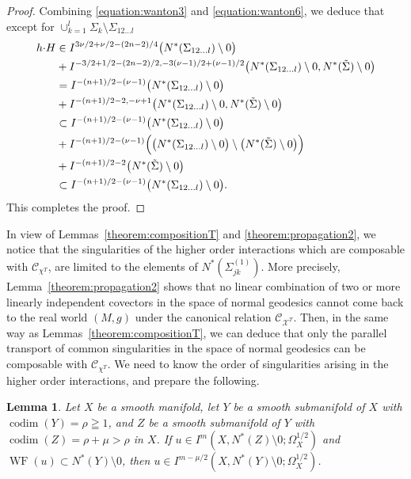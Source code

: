 \documentclass[a4paper,11pt,reqno]{amsart}
\numberwithin{equation}{section}
\newtheorem{lemma}[theorem]{Lemma}
\theoremstyle{definition}
\theoremstyle{remark}
\begin{document}
\begin{proof}
%
%
Combining \eqref{equation:wanton3} and \eqref{equation:wanton6}, 
we deduce that except for  $\cup_{k=1}^l\Sigma_k\setminus\Sigma_{12\dotsc{l}}$ 
%
%
\begin{align*}
   h{\cdot}H 
& \in 
    I^{3\nu/2+\nu/2-(2n-2)/4}\bigl(N^\ast(\Sigma_{12\dotsc{l}})\setminus0\bigr)
\\
& +
   I^{-3/2+1/2-(2n-2)/2,-3(\nu-1)/2+(\nu-1)/2}\bigl(N^\ast(\Sigma_{12\dotsc{l}})\setminus0,N^\ast(\tilde{\Sigma})\setminus0\bigr)
\\
& =
    I^{-(n+1)/2-(\nu-1)}\bigl(N^\ast(\Sigma_{12\dotsc{l}})\setminus0\bigr)
\\
& +
   I^{-(n+1)/2-2,-\nu+1}\bigl(N^\ast(\Sigma_{12\dotsc{l}})\setminus0,N^\ast(\tilde{\Sigma})\setminus0\bigr)
\\
& \subset 
   I^{-(n+1)/2-(\nu-1)}\bigl(N^\ast(\Sigma_{12\dotsc{l}})\setminus0\bigr)
\\
& +
   I^{-(n+1)/2-(\nu-1)}\Bigl(\bigl(N^\ast(\Sigma_{12\dotsc{l}})\setminus0\bigr) \setminus \bigl(N^\ast(\tilde{\Sigma})\setminus0\bigr)\Bigr) 
\\
& +
   I^{-(n+1)/2-2}\bigl(N^\ast(\tilde{\Sigma})\setminus0\bigr)
\\
& \subset
    I^{-(n+1)/2-(\nu-1)}\bigl(N^\ast(\Sigma_{12\dotsc{l}})\setminus0\bigr).
\end{align*}
%
%
This completes the proof.  
\end{proof}
%
%
In view of Lemmas~\ref{theorem:compositionT} and \ref{theorem:propagation2}, 
we notice that the singularities of the higher order interactions which are composable with $\mathcal{C}_{\chi^T}$, 
are limited to the elements of $N^\ast(\Sigma_{jk}^{(1)})$. 
More precisely, Lemma~\ref{theorem:propagation2} shows that no linear combination of two or more linearly independent covectors in the space of normal geodesics cannot come back to the real world $(M,g)$ under the canonical relation $\mathcal{C}_{\mathcal{X}^T}$. 
Then, in the same way as Lemmas~\ref{theorem:compositionT}, we can deduce that only the parallel transport of common singularities in the space of normal geodesics can be composable with $\mathcal{C}_{\chi^T}$. 
We need to know the order of singularities arising in the higher order interactions, 
and prepare the following.  
%
%
\begin{lemma}
\label{theorem:conormalx}
Let $X$ be a smooth manifold, 
let $Y$ be a smooth submanifold of $X$ with 
$\operatorname{codim}(Y)=\rho\geqq1$, 
and $Z$ be a smooth submanifold of $Y$ with 
$\operatorname{codim}(Z)=\rho+\mu>\rho$ in $X$. 
If $u \in I^m(X,N^\ast(Z)\setminus0;\Omega^{1/2}_X)$ 
and $\operatorname{WF}(u)\subset N^\ast(Y)\setminus0$, then 
$u \in I^{m-\mu/2}(X,N^\ast(Y)\setminus0;\Omega^{1/2}_X)$.  
\end{lemma}
\end{document}
